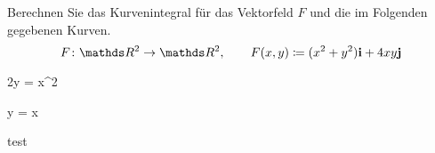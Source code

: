 \begin{atiTask}[
  title = Wegintegrale berechnen
]
  Berechnen Sie das Kurvenintegral für das Vektorfeld $F$ und die im Folgenden gegebenen Kurven.
  \[
    \function{F}{\setReal^2}{\setReal^2}
    \separate
    F(x,y)\define (x^2+y^2)\vectorX + 4xy\vectorY
  \]
  \begin{atiSubequations}
    \item{
      2y = x^2
    }
    \item{
      y = x
    }
    \item{
      test
    }
  \end{atiSubequations}
\end{atiTask}